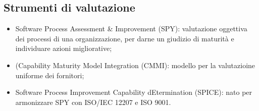 \subsection{Strumenti di valutazione}
\label{sub:strumenti_di_valutazione}

\begin{itemize}
  \item Software Process Assessment \& Improvement (SPY): valutazione oggettiva
    dei processi di una organizzazione, per darne un giudizio di maturità e
    individuare azioni migliorative;
  \item (Capability Maturity Model Integration (CMMI): modello per la
    valutazioine uniforme dei fornitori;
  \item Software Process Improvement Capability dEtermination (SPICE): nato per
    armonizzare SPY con ISO/IEC 12207 e ISO 9001.
\end{itemize}
